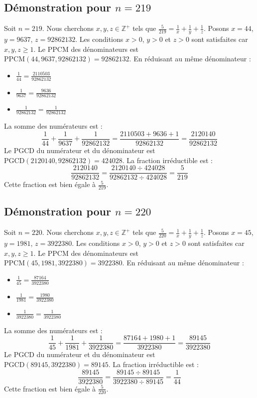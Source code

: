 \documentclass[11pt,a4paper]{article}
\begin{document}
\subsection{Démonstration pour $n = 219$}
Soit $n = 219$. Nous cherchons $x, y, z \in \mathbb{Z}^{+}$ tels que $\frac{5}{219} = \frac{1}{x} + \frac{1}{y} + \frac{1}{z}$.
Posons $x = 44$, $y = 9637$, $z = 92862132$.
Les conditions $x > 0$, $y > 0$ et $z > 0$ sont satisfaites car $x, y, z \geq 1$.
Le PPCM des dénominateurs est $\text{PPCM}(44, 9637, 92862132) = 92862132$.
En réduisant au même dénominateur :
\begin{itemize}
    \item $\frac{1}{44} = \frac{2110503}{92862132}$
    \item $\frac{1}{9637} = \frac{9636}{92862132}$
    \item $\frac{1}{92862132} = \frac{1}{92862132}$
\end{itemize}
La somme des numérateurs est :
$$ \frac{1}{44} + \frac{1}{9637} + \frac{1}{92862132} = \frac{2110503 + 9636 + 1}{92862132} = \frac{2120140}{92862132} $$
Le PGCD du numérateur et du dénominateur est $\text{PGCD}(2120140, 92862132) = 424028$.
La fraction irréductible est :
$$ \frac{2120140}{92862132} = \frac{2120140 \div 424028}{92862132 \div 424028} = \frac{5}{219} $$
Cette fraction est bien égale à $\frac{5}{219}$.

\subsection{Démonstration pour $n = 220$}
Soit $n = 220$. Nous cherchons $x, y, z \in \mathbb{Z}^{+}$ tels que $\frac{5}{220} = \frac{1}{x} + \frac{1}{y} + \frac{1}{z}$.
Posons $x = 45$, $y = 1981$, $z = 3922380$.
Les conditions $x > 0$, $y > 0$ et $z > 0$ sont satisfaites car $x, y, z \geq 1$.
Le PPCM des dénominateurs est $\text{PPCM}(45, 1981, 3922380) = 3922380$.
En réduisant au même dénominateur :
\begin{itemize}
    \item $\frac{1}{45} = \frac{87164}{3922380}$
    \item $\frac{1}{1981} = \frac{1980}{3922380}$
    \item $\frac{1}{3922380} = \frac{1}{3922380}$
\end{itemize}
La somme des numérateurs est :
$$ \frac{1}{45} + \frac{1}{1981} + \frac{1}{3922380} = \frac{87164 + 1980 + 1}{3922380} = \frac{89145}{3922380} $$
Le PGCD du numérateur et du dénominateur est $\text{PGCD}(89145, 3922380) = 89145$.
La fraction irréductible est :
$$ \frac{89145}{3922380} = \frac{89145 \div 89145}{3922380 \div 89145} = \frac{1}{44} $$
Cette fraction est bien égale à $\frac{5}{220}$.
\end{document}
